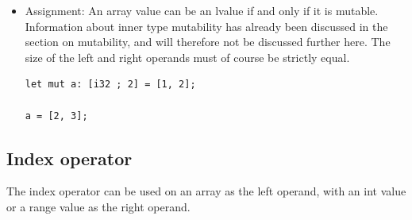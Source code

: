\begin{itemize}
\item Assignment: An array value can be an lvalue if and only if it is mutable.
  Information about inner type mutability has already been discussed in the
  section on mutability, and will therefore not be discussed further here. The
  size of the left and right operands must of course be strictly equal.

  \begin{lstlisting}[style=coloredverbatim]
let mut a: [i32 ; 2] = [1, 2];

a = [2, 3];
  \end{lstlisting}

\end{itemize}

\subsection{Index operator}

The index operator can be used on an array as the left operand, with an int
value or a range value as the right operand.

